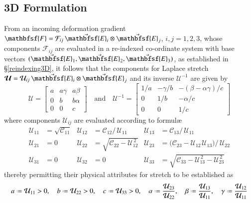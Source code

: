 \subsection{3D Formulation}

From an incoming deformation gradient $\mathbfsf{F} = \mathcal{F}_{ij} \, \vec{\mathbfsf{E}}_i \otimes \vec{\mathbfsf{E}}_j$, $i, j = 1, 2, 3$, whose components $\mathcal{F}_{ij}$ are evaluated in a re-indexed co-ordinate system with base vectors $( \vec{\mathbfsf{E}}_1 , \vec{\mathbfsf{E}}_2 , \vec{\mathbfsf{E}}_3 )$, as established in \S\ref{reindexing3D}, it follows that the components for Laplace stretch $\boldsymbol{\mathcal{U}} = \mathcal{U}_{ij} \, \vec{\mathbfsf{E}}_i \otimes \vec{\mathbfsf{E}}_j$ and its inverse $\boldsymbol{\mathcal{U}}^{-1}$ are given by
\begin{equation}
\boldsymbol{\mathcal{U}} = 
\begin{bmatrix}
a & a \gamma & a \beta \\ 0 & b & b \alpha \\ 0 & 0 & c
\end{bmatrix} 
\quad \text{and} \quad
\boldsymbol{\mathcal{U}}^{-1} = \begin{bmatrix}
1/a & -\gamma / b & -( \beta - \alpha \gamma ) / c \\
0 & 1 / b & -\alpha / c \\
0 & 0 & 1/c
\end{bmatrix}
\label{LaplaceStretch}
\end{equation}
where components $\mathcal{U}_{ij}$ are evaluated according to formul\ae\
\begin{equation}
\begin{aligned}
\mathcal{U}_{11} & = \sqrt{\mathcal{C}_{11}} & 
\mathcal{U}_{12} & = \mathcal{C}_{12} / \, \mathcal{U}_{11} &
\mathcal{U}_{13} & = \mathcal{C}_{13} / \, \mathcal{U}_{11} \\
\mathcal{U}_{21} & = 0 &
\mathcal{U}_{22} & = \sqrt{\mathcal{C}_{22} - \mathcal{U}_{12}^{\,2}} &
\mathcal{U}_{23} & = \bigl( \mathcal{C}_{23} - \mathcal{U}_{12\,} \mathcal{U}_{13} \bigr) / \, \mathcal{U}_{22} \\
\mathcal{U}_{31} & = 0 &
\mathcal{U}_{32} & = 0 & 
\mathcal{U}_{33} & = \sqrt{ \mathcal{C}_{33} - \mathcal{U}_{13}^{\,2} - \mathcal{U}_{23}^{\,2}}
\end{aligned}
\label{LagrangianLaplaceStretch}
\end{equation}
thereby permitting their physical attributes for stretch to be established as
\begin{equation}
a \defeq \mathcal{U}_{11} > 0 , \quad
b \defeq \mathcal{U}_{22} > 0 , \quad
c \defeq \mathcal{U}_{33} > 0 , \quad
\alpha \defeq \frac{\mathcal{U}_{23}}{\mathcal{U}_{22}} , \quad
\beta \defeq \frac{\mathcal{U}_{13}}{\mathcal{U}_{11}} , \quad
\gamma \defeq \frac{\mathcal{U}_{12}}{\mathcal{U}_{11}}
\label{LagrangianPhysicalAttributes}
\end{equation}
